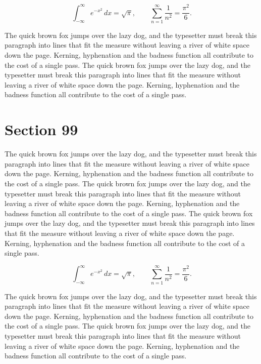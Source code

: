 \documentclass{article}
\begin{document}
\begin{equation}
\int_{-\infty}^{\infty} e^{-x^{2}}\,dx = \sqrt{\pi}, \qquad
\sum_{n=1}^{\infty} \frac{1}{n^{2}} = \frac{\pi^{2}}{6}.
\end{equation}

The quick brown fox jumps over the lazy dog, and the typesetter must break this paragraph into lines that fit the measure without leaving a river of white space down the page. Kerning, hyphenation and the badness function all contribute to the cost of a single pass. The quick brown fox jumps over the lazy dog, and the typesetter must break this paragraph into lines that fit the measure without leaving a river of white space down the page. Kerning, hyphenation and the badness function all contribute to the cost of a single pass. 
\section{Section 99}
The quick brown fox jumps over the lazy dog, and the typesetter must break this paragraph into lines that fit the measure without leaving a river of white space down the page. Kerning, hyphenation and the badness function all contribute to the cost of a single pass. The quick brown fox jumps over the lazy dog, and the typesetter must break this paragraph into lines that fit the measure without leaving a river of white space down the page. Kerning, hyphenation and the badness function all contribute to the cost of a single pass. The quick brown fox jumps over the lazy dog, and the typesetter must break this paragraph into lines that fit the measure without leaving a river of white space down the page. Kerning, hyphenation and the badness function all contribute to the cost of a single pass. 

\begin{equation}
\int_{-\infty}^{\infty} e^{-x^{2}}\,dx = \sqrt{\pi}, \qquad
\sum_{n=1}^{\infty} \frac{1}{n^{2}} = \frac{\pi^{2}}{6}.
\end{equation}

The quick brown fox jumps over the lazy dog, and the typesetter must break this paragraph into lines that fit the measure without leaving a river of white space down the page. Kerning, hyphenation and the badness function all contribute to the cost of a single pass. The quick brown fox jumps over the lazy dog, and the typesetter must break this paragraph into lines that fit the measure without leaving a river of white space down the page. Kerning, hyphenation and the badness function all contribute to the cost of a single pass. 
\end{document}
